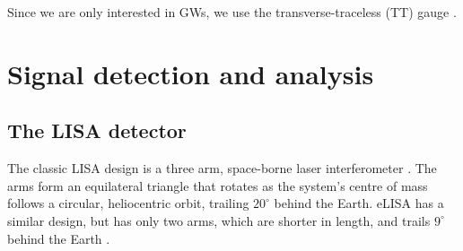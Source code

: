 Since we are only interested in GWs, we use the transverse-traceless (TT) gauge \citep[box 35.1]{Misner1973}.

\section{Signal detection and analysis}\label{sec:Signal}

\subsection{The LISA detector}\label{sec:Detector}

The classic LISA design is a three arm, space-borne laser interferometer \citep{Bender1998, Danzmann2003}. The arms form an equilateral triangle that rotates as the system's centre of mass follows a circular, heliocentric orbit, trailing $20^{\circ}$ behind the Earth. eLISA has a similar design, but  has only two arms, which are shorter in length, and trails $9^{\circ}$ behind the Earth \citep{Jennrich2011}.

